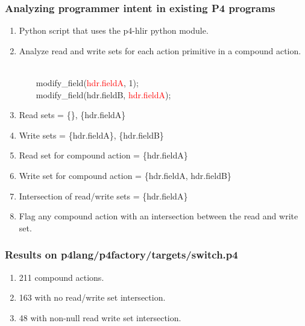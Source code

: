 \documentclass[aspectratio=169]{beamer}
\begin{document}
\begin{frame}[fragile]
  \frametitle{Analyzing programmer intent in existing P4 programs}
  \begin{enumerate}
    \item<1-> Python script that uses the p4-hlir python module.
    \item<2-> Analyze read and write sets for each action primitive in a compound action.
      \begin{texttt} \\
        \ \ \ \ modify\_field(\textcolor{red}{hdr.fieldA}, 1); \\
        \ \ \ \ modify\_field(hdr.fieldB, \textcolor{red}{hdr.fieldA}); \\
      \end{texttt}
    \item<3-> Read  sets = \{\}, \{hdr.fieldA\}
    \item<4-> Write sets = \{hdr.fieldA\}, \{hdr.fieldB\}
    \item<5-> Read set for compound action = \{hdr.fieldA\}
    \item<6-> Write set for compound action = \{hdr.fieldA, hdr.fieldB\}
    \item<7-> Intersection of read/write sets = \{hdr.fieldA\} 
    \item<8-> Flag any compound action with an intersection between the read and write set.
  \end{enumerate}
\end{frame}

\begin{frame}[fragile]
  \frametitle{Results on p4lang/p4factory/targets/switch.p4}
  \begin{enumerate}
    \item<1-> 211 compound actions.
    \item<2-> 163 with no read/write set intersection.
    \item<3-> 48 with non-null read write set intersection.
  \end{enumerate}
\end{frame}
\end{document}

